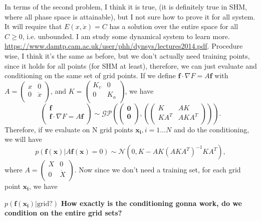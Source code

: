 \documentclass{article}
\begin{document}
In terms of the second problem, I think it is true, (it is definitely true in SHM, where all phase space is attainable), but I not sure how to prove it for all system.
It will require that $E(x, \dot{x})=C$ has a solution over the entire space for all $C\ge0$, i.e. unbounded. 
I am study some dynamical system to learn more.
\url{https://www.damtp.cam.ac.uk/user/phh/dynsys/lectures2014.pdf}.
Procedure wise, I think it's the same as before, but we don't actually need training points, since it holds for all points (for SHM at least), therefore, we can just evaluate and conditioning on the same set of grid points. 
If we define $\mathbf{f}\cdot\nabla F = A\mathbf{f}$ with $A=\begin{pmatrix}x & 0\\0&\dot{x}\\\end{pmatrix}$, and $K = \begin{pmatrix}
  K_v&0\\0&K_a\\
\end{pmatrix}$, we have 
\begin{equation}
  \begin{pmatrix}
    \mathbf{f}\\
    \mathbf{f}\cdot\nabla F = A\mathbf{f} \\
  \end{pmatrix}
  \sim\mathcal{GP}
  \left(
  \begin{pmatrix}
    \mathbf{0}\\
    \mathbf{0}\\
  \end{pmatrix}
  ,
  \left(
  \begin{pmatrix}
    K & AK \\ KA^T & AKA^T\\
  \end{pmatrix}
  \right)
  \right).
\end{equation}
Therefore, if we evaluate on N grid points $\mathbf{x_i}, i=1\dots N$ and do the conditioning, we will have 
$$
p(\mathbf{f}(\mathbf{x})|A\mathbf{f}(\mathbf{x})=0)\sim\mathcal{N}(0, K-AK(AKA^T)^{-1}KA^T),
$$
where $A=\begin{pmatrix}
  X & 0 \\0 & \dot{X}\\
\end{pmatrix}.$
Now since we don't need a training set, for each grid point $\mathbf{x_i}$, we have 

$p(\mathbf{f}(\mathbf{x_i})|\text{grid?})$
\textbf{How exactly is the conditioning gonna work, do we condition on the entire grid sets?}
\end{document}
